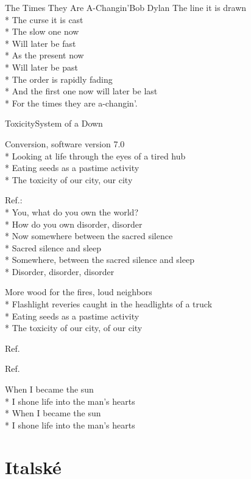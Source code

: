\documentclass[10.5pt]{book}
\begin{document}
\begin{poem}{The Times They Are A-Changin'}{Bob Dylan}
The line it is drawn\\*
The curse it is cast\\*
The slow one now\\*
Will later be fast\\*
As the present now\\*
Will later be past\\*
The order is rapidly fading\\*
And the first one now will later be last\\*
For the times they are a-changin'.

\end{poem}

\begin{poem}{Toxicity}{System of a Down}

\settowidth{\versewidth}{Flashlight reveries caught in the headlights of a truck}

Conversion, software version 7.0\\*
Looking at life through the eyes of a tired hub\\*
Eating seeds as a pastime activity\\*
The toxicity of our city, our city

Ref.:\\*
You, what do you own the world?\\*
How do you own disorder, disorder\\*
Now somewhere between the sacred silence\\*
Sacred silence and sleep\\*
Somewhere, between the sacred silence and sleep\\*
Disorder, disorder, disorder

More wood for the fires, loud neighbors\\*
Flashlight reveries caught in the headlights of a truck\\*
Eating seeds as a pastime activity\\*
The toxicity of our city, of our city

Ref.

Ref.

When I became the sun\\*
I shone life into the man's hearts\\*
When I became the sun\\*
I shone life into the man's hearts

\end{poem}

\section{Italské}
\end{document}
